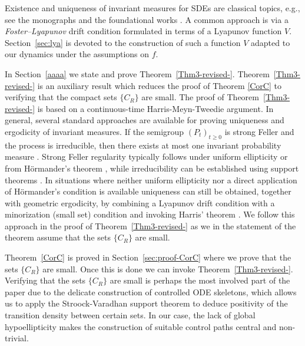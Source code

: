 \documentclass[11pt, a4paper,leqno]{amsart}
\theoremstyle{definition}
\numberwithin{equation}{section}
\begin{document}
Existence and uniqueness of invariant measures for SDEs are classical topics, e.g., see the monographs \cite{Hasminskii2012,MeynTweedie2009,BogachevKrylovRoeckner2015,BakryGentilLedoux2014,Villani2009}
and the foundational works \cite{Doob1953,StroockVaradhan1979,Hormander1967,LindvallRogers1986,Eberle2016,Eberle2019,HairerMattingly2011b,MattinglyStuartHigham2002}.
A common approach is via a \emph{Foster–Lyapunov} drift condition formulated in terms of a Lyapunov function \(V\).
Section~\ref{sec:lya} is devoted to the construction of such a function \(V\) adapted to our dynamics under the assumptions on \(f\).


In  Section~\ref{aaaa} we state and prove  Theorem~\ref{Thm3-revised-}. Theorem~\ref{Thm3-revised-} is an auxiliary result which reduces the proof of Theorem \ref{CorC} to verifying that
the compact sets $\{C_R\}$ are small. The proof of Theorem~\ref{Thm3-revised-} is based on a
continuous-time Harris-Meyn-Tweedie argument.   In general, several standard approaches are available for proving uniqueness and
ergodicity of invariant measures. If the semigroup $(P_t)_{t\ge0}$ is strong
Feller and the process is irreducible, then there exists at most one
invariant probability measure \cite{Doob1953}. Strong Feller regularity
typically follows under uniform ellipticity or from Hörmander’s theorem
\cite{Hormander1967}, while irreducibility can be established using support
theorems \cite{StroockVaradhan1979}. In situations where neither uniform ellipticity nor a direct application of
Hörmander’s condition is available  uniqueness can
still be obtained, together with geometric ergodicity, by combining a Lyapunov
drift condition with a minorization (small set) condition and invoking
Harris’ theorem \cite{MeynTweedie2009,HairerMattingly2011b}. We follow this
approach in the proof of Theorem~\ref{Thm3-revised-} as we in the statement of the theorem assume that the sets $\{C_R\}$ are small.


Theorem~\ref{CorC} is proved in Section~\ref{sec:proof-CorC} where we prove that the sets $\{C_R\}$ are small. Once this is done we can invoke Theorem~\ref{Thm3-revised-}. Verifying that the sets $\{C_R\}$ are small is perhaps the most involved part of the paper due to the delicate construction of controlled
ODE skeletons, which allows us to apply the Stroock-Varadhan support
theorem to deduce positivity of the transition density between certain
sets. In our case, the lack of global hypoellipticity makes the construction of suitable
control paths central and non-trivial.
\end{document}

